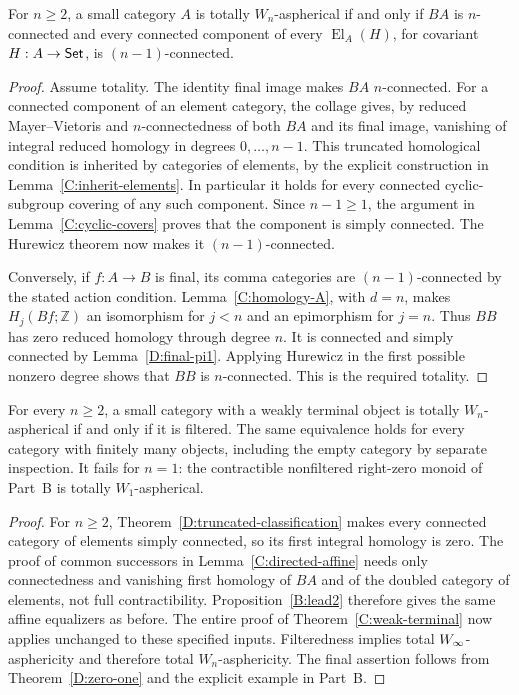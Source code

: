 \begin{theorem}\label{D:truncated-classification}
For $n\geq2$, a small category $A$ is totally $W_n$-aspherical if and only if $BA$ is $n$-connected and every connected component of every $\operatorname{El}_A(H)$, for covariant $H:A\to\mathsf{Set}$, is $(n-1)$-connected.
\end{theorem}
\begin{proof}
Assume totality. The identity final image makes $BA$ $n$-connected. For a connected component of an element category, the collage gives, by reduced Mayer--Vietoris and $n$-connectedness of both $BA$ and its final image, vanishing of integral reduced homology in degrees $0,\ldots,n-1$. This truncated homological condition is inherited by categories of elements, by the explicit construction in Lemma~\ref{C:inherit-elements}. In particular it holds for every connected cyclic-subgroup covering of any such component. Since $n-1\geq1$, the argument in Lemma~\ref{C:cyclic-covers} proves that the component is simply connected. The Hurewicz theorem now makes it $(n-1)$-connected.

Conversely, if $f:A\to B$ is final, its comma categories are $(n-1)$-connected by the stated action condition. Lemma~\ref{C:homology-A}, with $d=n$, makes $H_j(Bf;\mathbb Z)$ an isomorphism for $j<n$ and an epimorphism for $j=n$. Thus $BB$ has zero reduced homology through degree $n$. It is connected and simply connected by Lemma~\ref{D:final-pi1}. Applying Hurewicz in the first possible nonzero degree shows that $BB$ is $n$-connected. This is the required totality.
\end{proof}

\begin{corollary}\label{D:truncated-finite}
For every $n\geq2$, a small category with a weakly terminal object is totally $W_n$-aspherical if and only if it is filtered. The same equivalence holds for every category with finitely many objects, including the empty category by separate inspection. It fails for $n=1$: the contractible nonfiltered right-zero monoid of Part~B is totally $W_1$-aspherical.
\end{corollary}
\begin{proof}
For $n\geq2$, Theorem~\ref{D:truncated-classification} makes every connected category of elements simply connected, so its first integral homology is zero. The proof of common successors in Lemma~\ref{C:directed-affine} needs only connectedness and vanishing first homology of $BA$ and of the doubled category of elements, not full contractibility. Proposition~\ref{B:lead2} therefore gives the same affine equalizers as before. The entire proof of Theorem~\ref{C:weak-terminal} now applies unchanged to these specified inputs. Filteredness implies total $W_{\infty}$-asphericity and therefore total $W_n$-asphericity. The final assertion follows from Theorem~\ref{D:zero-one} and the explicit example in Part~B.
\end{proof}

